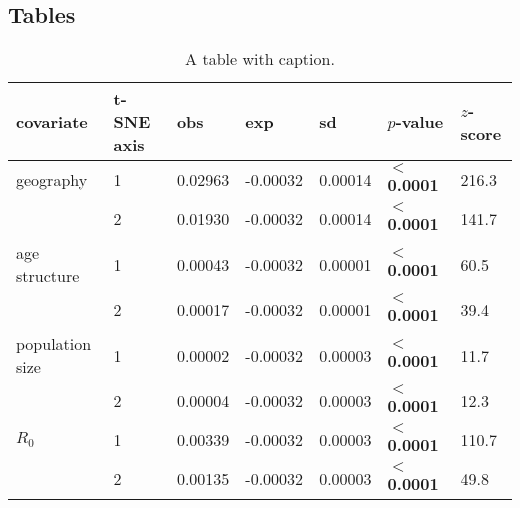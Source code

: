 \documentclass[12pt]{article}
\begin{document}
\paragraph*{}








\paragraph*{}





 
 
 












\clearpage










\clearpage
\subsection*{Tables}


\begin{table}[ht]
\centering
\caption{A table with caption. }
\label{tab:moran}
\begin{tabular}{lllllll}
  \hline
  covariate & t-SNE axis & obs & exp & sd & $p$-value & $z$-score \\ 
  \hline
  geography       & 1 & 0.02963 & -0.00032 & 0.00014 & \textbf{$<$ 0.0001} & 216.3 \\ 
                  & 2 & 0.01930 & -0.00032 & 0.00014 & \textbf{$<$ 0.0001} & 141.7 \\ 
  age structure   & 1 & 0.00043 & -0.00032 & 0.00001 & \textbf{$<$ 0.0001} & 60.5  \\ 
                  & 2 & 0.00017 & -0.00032 & 0.00001 & \textbf{$<$ 0.0001} & 39.4  \\ 
  population size & 1 & 0.00002 & -0.00032 & 0.00003 & \textbf{$<$ 0.0001} & 11.7  \\ 
                  & 2 & 0.00004 & -0.00032 & 0.00003 & \textbf{$<$ 0.0001} & 12.3  \\ 
  $R_0$           & 1 & 0.00339 & -0.00032 & 0.00003 & \textbf{$<$ 0.0001} & 110.7 \\ 
                  & 2 & 0.00135 & -0.00032 & 0.00003 & \textbf{$<$ 0.0001} & 49.8  \\ 

 \hline
\end{tabular}
\end{table}
\end{document}
